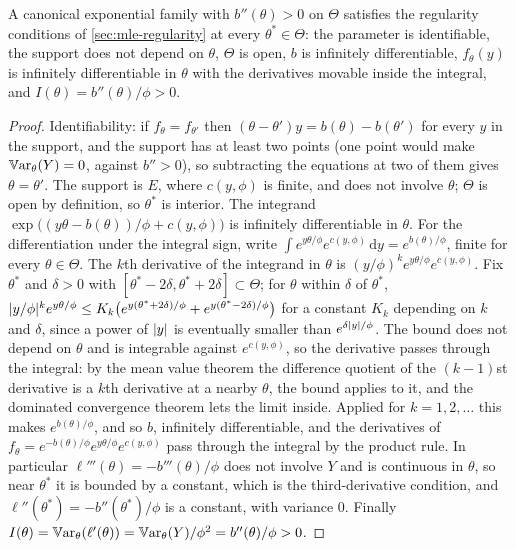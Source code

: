 \begin{proposition}
\label{prop:ef-regular}
A canonical exponential family with $b''(\theta) > 0$ on $\Theta$ satisfies the regularity conditions of \cref{sec:mle-regularity} at every $\theta^* \in \Theta$: the parameter is identifiable, the support does not depend on $\theta$, $\Theta$ is open, $b$ is infinitely differentiable, $f_\theta(y)$ is infinitely differentiable in $\theta$ with the derivatives movable inside the integral, and $I(\theta) = b''(\theta)/\phi > 0$.
\end{proposition}
\begin{proof}
Identifiability: if $f_\theta = f_{\theta'}$ then $(\theta - \theta')y = b(\theta) - b(\theta')$ for every $y$ in the support, and the support has at least two points (one point would make $\operatorname*{\mathbb{V}\text{ar}}_\theta(Y) = 0$, against $b'' > 0$), so subtracting the equations at two of them gives $\theta = \theta'$.
The support is $E$, where $c(y, \phi)$ is finite, and does not involve $\theta$; $\Theta$ is open by definition, so $\theta^*$ is interior.
The integrand $\exp\big((y\theta - b(\theta))/\phi + c(y, \phi)\big)$ is infinitely differentiable in $\theta$.
For the differentiation under the integral sign, write $\int e^{y\theta/\phi}e^{c(y, \phi)}\,\mathrm{d}y = e^{b(\theta)/\phi}$, finite for every $\theta \in \Theta$.
The $k$th derivative of the integrand in $\theta$ is $(y/\phi)^k e^{y\theta/\phi}e^{c(y, \phi)}$.
Fix $\theta^*$ and $\delta > 0$ with $[\theta^* - 2\delta, \theta^* + 2\delta] \subset \Theta$; for $\theta$ within $\delta$ of $\theta^*$, $\lvert y/\phi\rvert^k e^{y\theta/\phi} \leq K_k\big(e^{y(\theta^* + 2\delta)/\phi} + e^{y(\theta^* - 2\delta)/\phi}\big)$ for a constant $K_k$ depending on $k$ and $\delta$, since a power of $\lvert y\rvert$ is eventually smaller than $e^{\delta\lvert y\rvert/\phi}$.
The bound does not depend on $\theta$ and is integrable against $e^{c(y, \phi)}$, so the derivative passes through the integral: by the mean value theorem the difference quotient of the $(k-1)$st derivative is a $k$th derivative at a nearby $\theta$, the bound applies to it, and the dominated convergence theorem  lets the limit inside.
Applied for $k = 1, 2, \ldots$ this makes $e^{b(\theta)/\phi}$, and so $b$, infinitely differentiable, and the derivatives of $f_\theta = e^{-b(\theta)/\phi}e^{y\theta/\phi}e^{c(y, \phi)}$ pass through the integral by the product rule.
In particular $\ell'''(\theta) = -b'''(\theta)/\phi$ does not involve $Y$ and is continuous in $\theta$, so near $\theta^*$ it is bounded by a constant, which is the third-derivative condition, and $\ell''(\theta^*) = -b''(\theta^*)/\phi$ is a constant, with variance $0$.
Finally $I(\theta) = \operatorname*{\mathbb{V}\text{ar}}_\theta(\ell'(\theta)) = \operatorname*{\mathbb{V}\text{ar}}_\theta(Y)/\phi^2 = b''(\theta)/\phi > 0$.
\end{proof}

